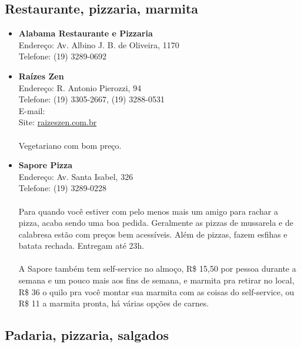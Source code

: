 \subsection{Restaurante, pizzaria, marmita}

\begin{itemize}
\item \textbf{Alabama Restaurante e Pizzaria}
  \\Endereço: Av. Albino J. B. de Oliveira, 1170
  \\Telefone: (19) 3289-0692

\item \textbf{Raízes Zen}
  \\Endereço: R. Antonio Pierozzi, 94
  \\Telefone: (19) 3305-2667, (19) 3288-0531
  \\E-mail: 
  \\Site: \url{raizeszen.com.br}
  \\
  \\Vegetariano com bom preço.

\item \textbf{Sapore Pizza}
  \\Endereço: Av. Santa Isabel, 326
  \\Telefone: (19) 3289-0228
  \\
  \\Para quando você estiver com pelo menos mais um amigo para rachar a pizza,
  acaba sendo uma boa pedida. Geralmente as pizzas de mussarela e de calabresa
  estão com preços bem acessíveis. Além de pizzas, fazem esfihas e batata
  rechada. Entregam até 23h.
  \\
  \\A Sapore também tem self-service no almoço, R\$ 15,50 por pessoa durante a
  semana e um pouco mais aos fins de semana, e marmita pra retirar no local,
  R\$ 36 o quilo pra você montar sua marmita com as coisas do self-service, ou
  R\$ 11 a marmita pronta, há várias opções de carnes.
\end{itemize}

\subsection{Padaria, pizzaria, salgados}

